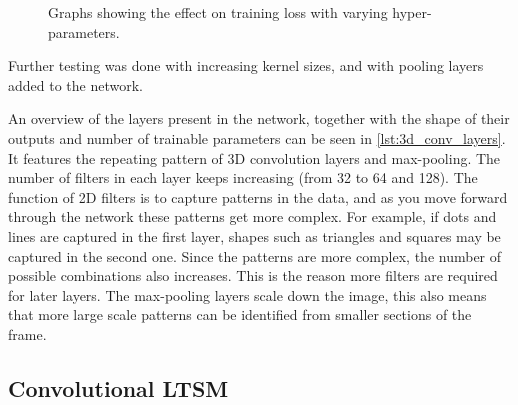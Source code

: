 \begin{figure}[htb]%
    \centering
    \caption{Graphs showing the effect on training loss with varying hyper-parameters.}%
    \label{fig:hyperparameter_tests}%
\end{figure}

Further testing was done with increasing kernel sizes, and with pooling layers added to the network. 

An overview of the layers present in the network, together with the shape of their outputs and number of trainable parameters can be seen in \cref{lst:3d_conv_layers}. It features the repeating pattern of 3D convolution layers and max-pooling. The number of filters in each layer keeps increasing (from 32 to 64 and 128). The function of 2D filters is to capture patterns in the data, and as you move forward through the network these patterns get more complex. For example, if dots and lines are captured in the first layer, shapes such as triangles and squares may be captured in the second one. Since the patterns are more complex, the number of possible combinations also increases. This is the reason more filters are required for later layers. The max-pooling layers scale down the image, this also means that more large scale patterns can be identified from smaller sections of the frame.

\subsection{Convolutional LTSM}


